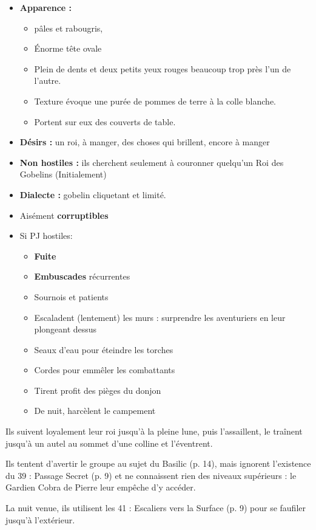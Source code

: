 \begin{itemize}
  \item \textbf{Apparence :} 
  \begin{itemize}
    \item pâles et rabougris, 
    \item \'Enorme tête ovale
    \item Plein de dents et deux petits yeux rouges beaucoup trop près l’un de l’autre. 
    \item Texture évoque une purée de pommes de terre à la colle blanche. 
    \item Portent sur eux des couverts de  table.
  \end{itemize}
  \item \textbf{ Désirs :} un roi, à manger, des choses qui brillent, encore à manger
  \item \textbf{Non hostiles :} ils cherchent seulement à couronner quelqu’un Roi des Gobelins (Initialement)
  \item \textbf{Dialecte :} gobelin cliquetant et limité.
  \item Aisément \textbf{corruptibles}
  \item Si PJ hostiles:
  \begin{itemize}
    \item \textbf{Fuite}
    \item \textbf{Embuscades} récurrentes
    \item Sournois et patients
    \item Escaladent (lentement) les murs : surprendre les aventuriers en leur plongeant dessus
    \item Seaux d’eau pour éteindre les torches
    \item Cordes pour emmêler les combattants
    \item Tirent profit des pièges du donjon
    \item De nuit, harcèlent le campement
  \end{itemize}
\end{itemize}

Ils suivent loyalement leur roi jusqu’à la pleine lune, puis l’assaillent, le traînent jusqu’à un autel au sommet d’une colline et l’éventrent. 

Ils tentent d’avertir le groupe au sujet du Basilic (p. 14), mais ignorent l’existence du 39 : Passage Secret (p. 9) et ne connaissent rien des niveaux supérieurs : le Gardien Cobra de Pierre leur empêche d’y accéder. 

La nuit venue, ils utilisent les 41 : Escaliers vers la Surface (p. 9) pour se faufiler jusqu’à l’extérieur. 

